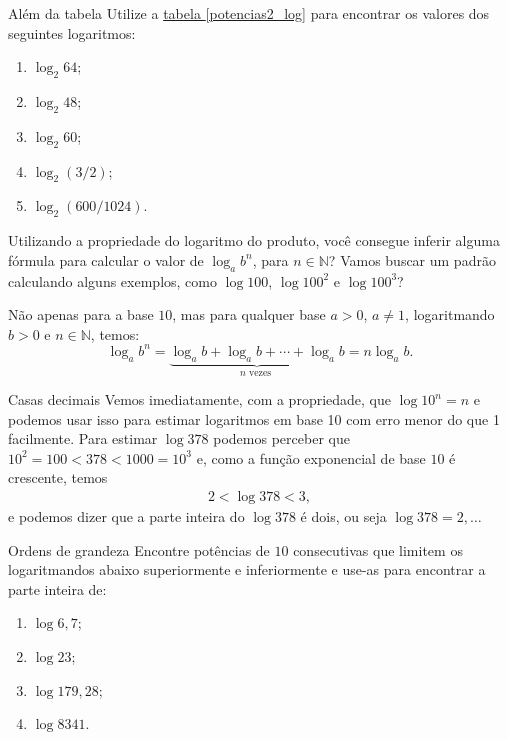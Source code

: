 \vspace{-1em}

\begin{task}{Além da tabela}
Utilize a \hyperref[potencias2_log]{tabela \ref{potencias2_log}} para encontrar os valores dos seguintes logaritmos:
\begin{enumerate}
\item $\log_2 64$;
\item $\log_2 48$;
\item $\log_2 60$;
\item $\log_2 (3/2)$;
\item $\log_2 (600/1024)$.
\end{enumerate}
\end{task}


\begin{reflection}
Utilizando a propriedade do logaritmo do produto, você consegue inferir alguma fórmula para calcular o valor de $\log_a b^n$, para $n \in \mathbb{N}$? Vamos buscar um padrão calculando alguns exemplos, como $\log 100$, $\log 100^2$ e $\log 100^3$?
\end{reflection}

\begin{observation}{}
Não apenas para a base $10$, mas para qualquer base $a>0$, $a \neq 1$, logaritmando $b>0$ e $n \in \mathbb{N}$, temos:
$$
\log_a b^n = \underbrace{\log_a b + \log_a b + \cdots + \log_a b}_{n \mbox{ vezes }} = n\log_a b.
$$
\end{observation}


\begin{example}{Casas decimais}
Vemos imediatamente, com a propriedade, que $\log 10^n =n$ e podemos usar isso para estimar logaritmos em base 10 com erro menor do que 1 facilmente. Para estimar $\log 378$ podemos perceber que $10^2=100<378<1000=10^3$ e, como a função exponencial de base $10$ é crescente, temos
\begin{align*}
2 < \log 378 < 3,
\end{align*}
e podemos dizer que a parte inteira do $\log 378$ é dois, ou seja $\log 378 = 2{,}\ldots$
\end{example}

\begin{task}{Ordens de grandeza}
Encontre potências de $10$ consecutivas que limitem os logaritmandos abaixo superiormente e inferiormente e use-as para encontrar a parte inteira de:
\begin{enumerate}
\item $\log 6{,}7$;
\item $\log 23$;
\item $\log 179{,}28$;
\item $\log 8341$.
\end{enumerate}
\end{task}


